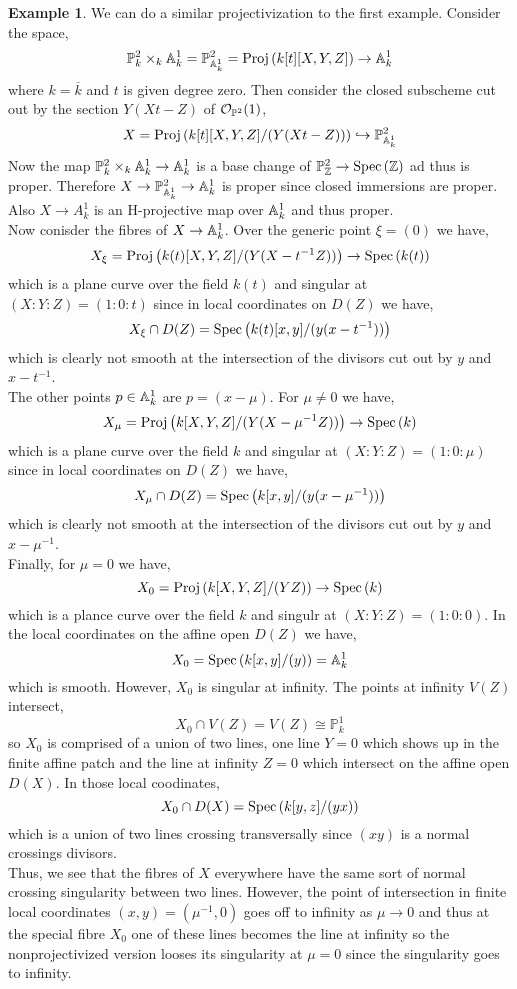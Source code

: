 \documentclass[12pt]{extarticle}
\newcommand{\Z}{\mathbb{Z}}
\theoremstyle{definition}
\newtheorem{example}[theorem]{Example}
\renewcommand{\P}{\mathbb{P}}
\newcommand{\embed}{\hookrightarrow}
\begin{document}
\begin{example}
We can do a similar projectivization to the first example. Consider the space,
\[ \P^2_k \times_k \A^1_k = \P^2_{\A^1_k} = \Proj{k[t][X,Y,Z]} \to \A^1_k \]
where $k = \overline{k}$ and $t$ is given degree zero. Then consider the closed subscheme cut out by the section $Y(X t - Z)$ of $\struct{\P^2}(1)$,
\[ X = \Proj{k[t][X, Y, Z]/(Y(X t - Z))} \embed \P^2_{\A^1_k} \]
Now the map $\P^2_k \times_k \A^1_k \to \A^1_k$ is a base change of $\P^2_\Z \to \Spec{\Z}$ ad thus is proper. Therefore $X \to \P^2_{\A^1_k} \to \A^1_k$ is proper since closed immersions are proper. Also $X \to A^1_k$ is an H-projective map over $\mathbb{A}^1_k$ and thus proper. 
\bigskip\\
Now conisder the fibres of $X \to \mathbb{A}^1_k$. Over the generic point $\xi = (0)$ we have,
\[ X_\xi = \mathrm{Proj}\left(k(t)[X, Y, Z]/(Y (X  - t^{-1} Z))\right) \to \mathrm{Spec}\left(k(t)\right) \]
which is a plane curve over the field $k(t)$ and singular at $(X : Y : Z) = (1 : 0 : t)$ since in local coordinates on $D(Z)$ we have,
\[ X_\xi \cap D(Z) = \mathrm{Spec}\left(k(t)[x, y]/(y (x - t^{-1} ))\right) \]
which is clearly not smooth at the intersection of the divisors cut out by $y$ and $x - t^{-1}$.
\bigskip\\
The other points $p \in \mathbb{A}^1_k$ are $p = (x - \mu)$. For $\mu \neq 0$ we have,
\[ X_\mu = \mathrm{Proj}\left(k[X, Y, Z]/(Y (X - \mu^{-1} Z))\right) \to \mathrm{Spec}\left(k\right) \]
which is a plane curve over the field $k$ and singular at $(X : Y : Z) = (1 : 0 : \mu)$ since in local coordinates on $D(Z)$ we have,
\[ X_\mu \cap D(Z) = \mathrm{Spec}\left(k[x, y] / (y (x - \mu^{-1}))\right) \]
which is clearly not smooth at the intersection of the divisors cut out by $y$ and $x - \mu^{-1}$.
\bigskip\\
Finally, for $\mu = 0$ we have,
\[ X_0 = \mathrm{Proj}\left(k[X, Y, Z]/(Y Z)\right) \to \mathrm{Spec}\left(k\right) \]
which is a plance curve over the field $k$ and singulr at $(X : Y : Z) = (1 : 0 : 0)$. In the local coordinates on the affine open $D(Z)$ we have,
\[ X_0 = \mathrm{Spec}\left(k[x, y]/(y)\right) = \mathbb{A}^1_k \]
which is smooth. However, $X_0$ is singular at infinity. The points at infinity $V(Z)$ intersect,
\[ X_0 \cap V(Z) = V(Z) \cong \P^1_k \]
so $X_0$ is comprised of a union of two lines, one line $Y = 0$ which shows up in the finite affine patch and the line at infinity $Z = 0$ which intersect on the affine open $D(X)$. In those local coodinates,
\[ X_0 \cap D(X) = \mathrm{Spec}\left(k[y, z]/(yx)\right) \]
which is a union of two lines crossing transversally since $(x y)$ is a normal crossings divisors. 
\bigskip\\
Thus, we see that the fibres of $X$ everywhere have the same sort of normal crossing singularity between two lines. However, the point of intersection in finite local coordinates $(x, y) = (\mu^{-1}, 0)$ goes off to infinity as $\mu \to 0$ and thus at the special fibre $X_0$ one of these lines becomes the line at infinity so the nonprojectivized version looses its singularity at $\mu = 0$ since the singularity goes to infinity. 
\end{example}
\end{document}

